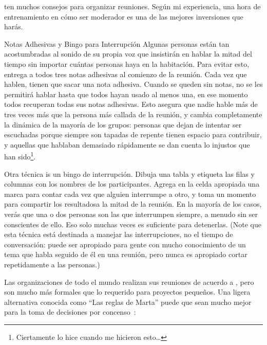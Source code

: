 \cite{Brow2007,Broo2016,Roge2018} ten muchos consejos para organizar reuniones.
Según mi experiencia,
una hora de entrenamiento en cómo ser moderador
es una de las mejores inversiones que harás.

\begin{aside}{Notas Adhesivas y Bingo para Interrupción}
  Algunas personas están tan acostumbradas al sonido de su propia voz
  que insistirán en hablar la mitad del tiempo
  sin importar cuántas personas haya en la habitación.
  Para evitar esto,
  entrega a todos tres notas adhesivas al comienzo de la reunión.
  Cada vez que hablen,
  tienen que sacar una nota adhesiva.
  Cuando se queden sin notas,
  no se les permitirá hablar hasta que todos hayan usado al menos una,
  en ese momento todos recuperan todas sus notas adhesivas.
  Esto asegura que nadie hable más de tres veces más que
  la persona más callada de la reunión,
  y cambia completamente la dinámica de la mayoría de los grupos:
  personas que dejan de intentar ser escuchadas porque siempre son tapadas
  de repente tienen espacio para contribuir,
  y aquellas que hablaban demasiado rápidamente se dan cuenta lo injustos que han sido\footnote{
    Ciertamente lo hice cuando me hicieron esto{\ldots}
  }.

  Otra técnica is un bingo de interrupción.
  Dibuja una tabla y etiqueta las filas y columnas con los nombres de los participantes.
  Agrega en la celda apropiada una marca para contar 
  cada vez que alguien interrumpe a otro,
  y toma un momento para compartir los resultadosa la mitad de la reunión.
  En la mayoría de los casos,
  verás que una o dos personas son las que interrumpen siempre,
  a menudo sin ser conscientes de ello.
  Eso solo muchas veces es suficiente  para detenerlas.
  (Note que esta técnica está destinada a manejar las interrupciones,
  no el tiempo de conversación:
  puede ser apropiado para gente con mucho conocimiento de un tema
  que habla seguido de él en una reunión,
  pero nunca es apropiado cortar repetidamente a las personas.)
\end{aside}


Las organizaciones de todo el mundo realizan sus reuniones de acuerdo a 
,
pero son mucho más formales que lo requerido para proyectos pequeños.
Una ligera alternativa conocida como ``Las reglas de Marta''
puede que sean mucho mejor para la toma de decisiones por concenso~\cite{Mina1986}:

